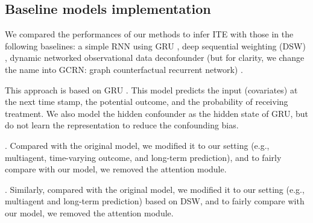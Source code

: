 \documentclass[journal]{IEEEtran}
\begin{document}

\begin{table}[ht!]
\centering
{}
\caption{\label{tab:computation} The averaged computation time [s] among 10 sequences in two datasets.}
\end{table}
\fi


\subsection{Baseline models implementation}
\label{app:baselines}
We compared the performances of our methods to infer ITE with those in the following baselines: a simple RNN using GRU \cite{Cho14},
deep sequential weighting (DSW) \cite{liu2020estimating}, dynamic networked observational data deconfounder (but for clarity, we change the name into GCRN: graph counterfactual recurrent network) \cite{ma2021deconfounding}.

 This approach is based on GRU \cite{Cho14}. This model predicts the input (covariates) at the next time stamp, the potential outcome, and the probability of receiving treatment.
We also model the hidden confounder as the hidden state of GRU, but do not learn the representation to reduce the confounding bias.  

 \cite{liu2020estimating}. Compared with the original model, we modified it to our setting (e.g., multiagent, time-varying outcome, and long-term prediction), and to fairly compare with our model, we removed the attention module. 

 \cite{ma2021deconfounding}. Similarly, compared with the original model, we modified it to our setting (e.g., multiagent and long-term prediction) based on DSW, and to fairly compare with our model, we removed the attention module. 
\end{document}
